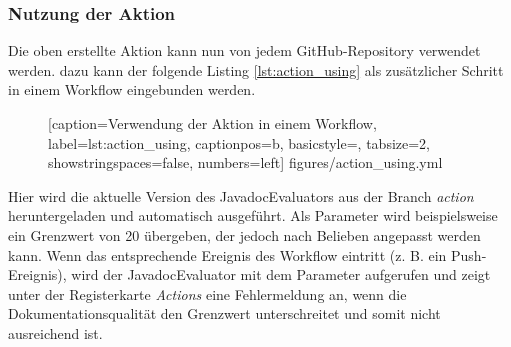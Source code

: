 \subsubsection{Nutzung der Aktion}

Die oben erstellte Aktion kann nun von jedem GitHub-Repository verwendet werden. dazu kann der folgende Listing \ref{lst:action_using} als zusätzlicher Schritt in einem Workflow eingebunden werden. 
\begin{figure} [htbp]

[caption={Verwendung der Aktion in einem Workflow},
label={lst:action_using},
captionpos=b, basicstyle=\footnotesize, tabsize=2, showstringspaces=false,  numbers=left]
{figures/action_using.yml}
\end{figure}

Hier wird die aktuelle Version des JavadocEvaluators aus der Branch \textit{action} heruntergeladen und automatisch ausgeführt. Als Parameter wird beispielsweise ein Grenzwert von 20 übergeben, der jedoch nach Belieben angepasst werden kann. Wenn das entsprechende Ereignis des Workflow eintritt (z. B. ein Push-Ereignis), wird der JavadocEvaluator mit dem Parameter aufgerufen und zeigt unter der Registerkarte \textit{Actions} eine Fehlermeldung an, wenn die Dokumentationsqualität den Grenzwert unterschreitet und somit nicht ausreichend ist. 